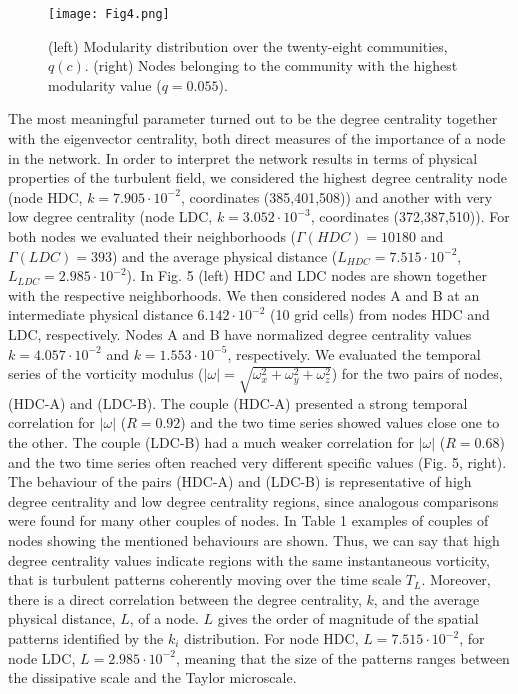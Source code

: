 \documentclass{ws-ijbc}
\begin{document}
\begin{figure}[h]
\texttt{[image: Fig4.png]}
\caption{(left) Modularity distribution over the twenty-eight communities, $q(c)$. (right) Nodes belonging to the community with the highest modularity value ($q=0.055$).}
\label{modularity}
\end{figure}

The most meaningful parameter turned out to be the degree centrality together with the eigenvector centrality, both direct measures of the importance of a node in the network. In order to interpret the network results in terms of physical properties of the turbulent field, we considered the highest degree centrality node (node HDC, $k=7.905 \cdot 10^{-2}$, coordinates (385,401,508)) and another with very low degree centrality (node LDC, $k=3.052 \cdot 10^{-3}$, coordinates (372,387,510)). For both nodes we evaluated their neighborhoods ($\Gamma(HDC)=10180$ and $\Gamma(LDC)=393$) and the average physical distance ($L_{HDC}=7.515 \cdot 10^{-2}$, $L_{LDC}=2.985 \cdot 10^{-2}$). In Fig. 5 (left) HDC and LDC nodes are shown together with the respective neighborhoods. We then considered nodes A and B at an intermediate physical distance $6.142 \cdot 10^{-2}$ (10 grid cells) from nodes HDC and LDC, respectively. Nodes A and B have normalized degree centrality values $k=4.057 \cdot 10^{-2}$ and $k=1.553 \cdot 10^{-5}$, respectively. We evaluated the temporal series of the vorticity modulus ($|\omega|= \sqrt{\omega_x^2 + \omega_y^2 + \omega_z^2}$) for the two pairs of nodes, (HDC-A) and (LDC-B). The couple (HDC-A) presented a strong temporal correlation for $|\omega|$ ($R=0.92$) and the two time series showed values close one to the other. The couple (LDC-B) had a much weaker correlation for $|\omega|$ ($R=0.68$) and the two time series often reached very different specific values (Fig. 5, right). The behaviour of the pairs (HDC-A) and (LDC-B) is representative of high degree centrality and low degree centrality regions, since analogous comparisons were found for many other couples of nodes. In Table 1 examples of couples of nodes showing the mentioned behaviours are shown. Thus, we can say that high degree centrality values indicate regions with the same instantaneous vorticity, that is turbulent patterns coherently moving over the time scale $T_L$. Moreover, there is a direct correlation between the degree centrality, $k$, and the average physical distance, $L$, of a node. $L$ gives the order of magnitude of the spatial patterns identified by the $k_i$ distribution. For node HDC, $L=7.515 \cdot 10^{-2}$, for node LDC, $L=2.985 \cdot 10^{-2}$, meaning that the size of the patterns ranges between the dissipative scale and the Taylor microscale.
\end{document}
